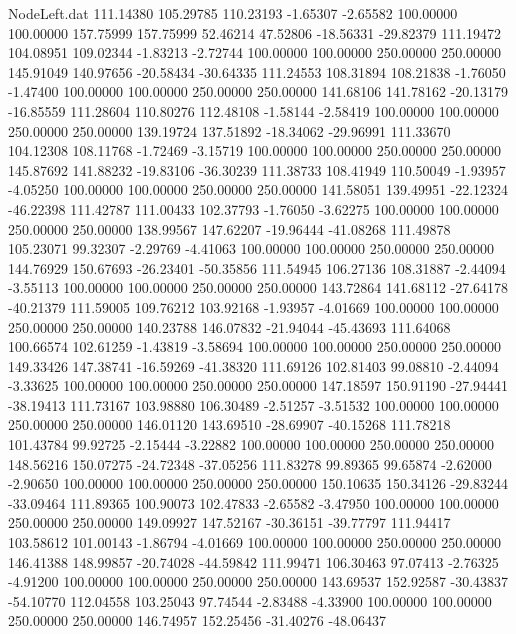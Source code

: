 \begin{filecontents}{NodeLeft.dat}
 111.14380  105.29785  110.23193    -1.65307   -2.65582  100.00000  100.00000  157.75999  157.75999   52.46214   47.52806  -18.56331  -29.82379
 111.19472  104.08951  109.02344    -1.83213   -2.72744  100.00000  100.00000  250.00000  250.00000  145.91049  140.97656  -20.58434  -30.64335
 111.24553  108.31894  108.21838    -1.76050   -1.47400  100.00000  100.00000  250.00000  250.00000  141.68106  141.78162  -20.13179  -16.85559
 111.28604  110.80276  112.48108    -1.58144   -2.58419  100.00000  100.00000  250.00000  250.00000  139.19724  137.51892  -18.34062  -29.96991
 111.33670  104.12308  108.11768    -1.72469   -3.15719  100.00000  100.00000  250.00000  250.00000  145.87692  141.88232  -19.83106  -36.30239
 111.38733  108.41949  110.50049    -1.93957   -4.05250  100.00000  100.00000  250.00000  250.00000  141.58051  139.49951  -22.12324  -46.22398
 111.42787  111.00433  102.37793    -1.76050   -3.62275  100.00000  100.00000  250.00000  250.00000  138.99567  147.62207  -19.96444  -41.08268
 111.49878  105.23071   99.32307    -2.29769   -4.41063  100.00000  100.00000  250.00000  250.00000  144.76929  150.67693  -26.23401  -50.35856
 111.54945  106.27136  108.31887    -2.44094   -3.55113  100.00000  100.00000  250.00000  250.00000  143.72864  141.68112  -27.64178  -40.21379
 111.59005  109.76212  103.92168    -1.93957   -4.01669  100.00000  100.00000  250.00000  250.00000  140.23788  146.07832  -21.94044  -45.43693
 111.64068  100.66574  102.61259    -1.43819   -3.58694  100.00000  100.00000  250.00000  250.00000  149.33426  147.38741  -16.59269  -41.38320
 111.69126  102.81403   99.08810    -2.44094   -3.33625  100.00000  100.00000  250.00000  250.00000  147.18597  150.91190  -27.94441  -38.19413
 111.73167  103.98880  106.30489    -2.51257   -3.51532  100.00000  100.00000  250.00000  250.00000  146.01120  143.69510  -28.69907  -40.15268
 111.78218  101.43784   99.92725    -2.15444   -3.22882  100.00000  100.00000  250.00000  250.00000  148.56216  150.07275  -24.72348  -37.05256
 111.83278   99.89365   99.65874    -2.62000   -2.90650  100.00000  100.00000  250.00000  250.00000  150.10635  150.34126  -29.83244  -33.09464
 111.89365  100.90073  102.47833    -2.65582   -3.47950  100.00000  100.00000  250.00000  250.00000  149.09927  147.52167  -30.36151  -39.77797
 111.94417  103.58612  101.00143    -1.86794   -4.01669  100.00000  100.00000  250.00000  250.00000  146.41388  148.99857  -20.74028  -44.59842
 111.99471  106.30463   97.07413    -2.76325   -4.91200  100.00000  100.00000  250.00000  250.00000  143.69537  152.92587  -30.43837  -54.10770
 112.04558  103.25043   97.74544    -2.83488   -4.33900  100.00000  100.00000  250.00000  250.00000  146.74957  152.25456  -31.40276  -48.06437

\end{filecontents}
